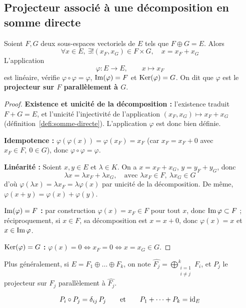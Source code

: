 \subsection{Projecteur associé à une décomposition en somme directe}

\begin{prop}
\label{prop:projecteur}
Soient $F,G$ deux sous-espaces vectoriels de $E$ tels que $F\oplus G=E$. Alors
\[\forall x\in E,\ \exists! (x_F,x_G)\in F\times G,\quad x=x_F+x_G\]
L'application
\[\varphi : E\to E, \qquad x\mapsto x_F\]
est linéaire, vérifie $\varphi\circ\varphi=\varphi$, $\operatorname{Im}(\varphi)=F$ et $\operatorname{Ker}(\varphi)=G$. On dit que $\varphi$ est le \textbf{projecteur sur $F$ parallèlement à $G$}.
\end{prop}

\begin{proof}
\textbf{Existence et unicité de la décomposition :} l'existence traduit $F+G=E$, et l'unicité l'injectivité de l'application $(x_F,x_G)\mapsto x_F+x_G$ (définition~\ref{defi:somme-directe}). L'application $\varphi$ est donc bien définie.

\textbf{Idempotence :} $\varphi(\varphi(x)) = \varphi(x_F) = x_F$ (car $x_F=x_F+0$ avec $x_F\in F,\ 0\in G$), donc $\varphi\circ\varphi=\varphi$.

\textbf{Linéarité :} Soient $x,y\in E$ et $\lambda\in K$. On a $x=x_F+x_G$, $y=y_F+y_G$, donc
\[\lambda x = \lambda x_F+\lambda x_G, \quad \text{avec } \lambda x_F\in F,\ \lambda x_G\in G\]
d'où $\varphi(\lambda x)=\lambda x_F=\lambda\varphi(x)$ par unicité de la décomposition. De même, $\varphi(x+y)=\varphi(x)+\varphi(y)$.

\textbf{$\operatorname{Im}(\varphi)=F$ :} par construction $\varphi(x)=x_F\in F$ pour tout $x$, donc $\operatorname{Im}\varphi\subset F$ ; réciproquement, si $x\in F$, sa décomposition est $x=x+0$, donc $\varphi(x)=x$ et $x\in\operatorname{Im}\varphi$.

\textbf{$\operatorname{Ker}(\varphi)=G$ :} $\varphi(x)=0 \iff x_F=0 \iff x=x_G\in G$.
\end{proof}

Plus généralement, si $E=F_1\oplus\dots\oplus F_k$, on note $\widehat{F_j} = \bigoplus_{\substack{i=1 \\ i\neq j}}^{k} F_i$, et $P_j$ le projecteur sur $F_j$ parallèlement à $\widehat{F_j}$.

\begin{prop}
\label{prop:projecteurs-famille}
\[P_i\circ P_j = \delta_{ij}\, P_j \qquad \text{et} \qquad P_1+\dots+P_k = \operatorname{id}_E\]
\end{prop}

